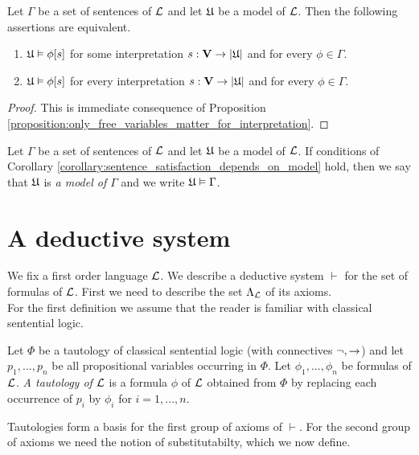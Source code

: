 \begin{corollary}\label{corollary:sentence_satisfaction_depends_on_model}
Let $\Gamma$ be a set of sentences of ${\mathcal L}$ and let ${\mathfrak U}$ be a model of ${\mathcal L}$. Then the following assertions are
equivalent.
\begin{enumerate}[label=\emph{\textbf{(\roman*)}}, leftmargin=3.0em]
\item ${\mathfrak U} \vDash \phi[s]$ for some interpretation $s:\mathbf{V}\rightarrow |{\mathfrak U}|$ and for every $\phi \in \Gamma$.
\item ${\mathfrak U} \vDash \phi[s]$ for every interpretation $s:\mathbf{V}\rightarrow |{\mathfrak U}|$ and for every $\phi \in \Gamma$.
\end{enumerate}
\end{corollary}
\begin{proof}
This is immediate consequence of Proposition \ref{proposition:only_free_variables_matter_for_interpretation}.
\end{proof}

\begin{definition}
Let $\Gamma$ be a set of sentences of ${\mathcal L}$ and let ${\mathfrak U}$ be a model of ${\mathcal L}$. If conditions of Corollary \ref{corollary:sentence_satisfaction_depends_on_model} hold, then we say that ${\mathfrak U}$ is \textit{a model of $\Gamma$} and we write ${\mathfrak U} \vDash \Gamma$.
\end{definition}

\section{A deductive system}
\noindent
We fix a first order language ${\mathcal L}$. We describe a deductive system $\vdash$ for the set of formulas of ${\mathcal L}$. First we need to describe the set $\Lambda_{\mathcal L}$ of its axioms.\\
For the first definition we assume that the reader is familiar with classical sentential logic.

\begin{definition}
Let $\Phi$ be a tautology of classical sentential logic (with connectives $\neg, \rightarrow$) and let $p_1,...,p_n$ be all propositional variables occurring in $\Phi$. Let $\phi_1,...,\phi_n$ be formulas of ${\mathcal L}$. \textit{A tautology of ${\mathcal L}$} is a formula $\phi$ of ${\mathcal L}$ obtained from $\Phi$ by replacing each occurrence of $p_i$ by $\phi_i$ for $i = 1, ..., n$.
\end{definition}
\noindent
Tautologies form a basis for the first group of axioms of $\vdash$. For the second group of axioms we need the notion of substitutabilty, which we now define.

